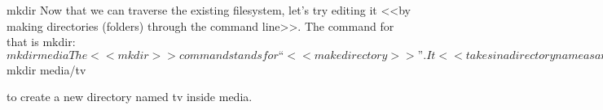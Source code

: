 mkdir
    Now that we can traverse the existing filesystem, let’s try editing it <<by making directories (folders) through the command line>>. The command for that is mkdir:
        $ mkdir media
    
    The <<mkdir>> command stands for “<<make directory>>”. It <<takes in a directory name as an argument and then creates a new directory in the current working directory>>.

    Here we used mkdir to create a new directory named media/ inside our working directory.

Instructions
    1.
    Navigate to the /home/ccuser/workspace/blog/2014/dec/ directory.

    Then list all files and directories in the working directory to see what’s currently in there.

    2.
    Create a new directory named media. If you list the contents of the working directory again, you should see your new directory.

    3.
    We’ve made our new media directory, but what if we wanted to create another directory inside that one? We could cd into media and then use mkdir, or we could make the new directory from our current position by using a / to combine arguments as we did in the last lesson.

    Use:
        $ mkdir media/tv
    
    to create a new directory named tv inside media.